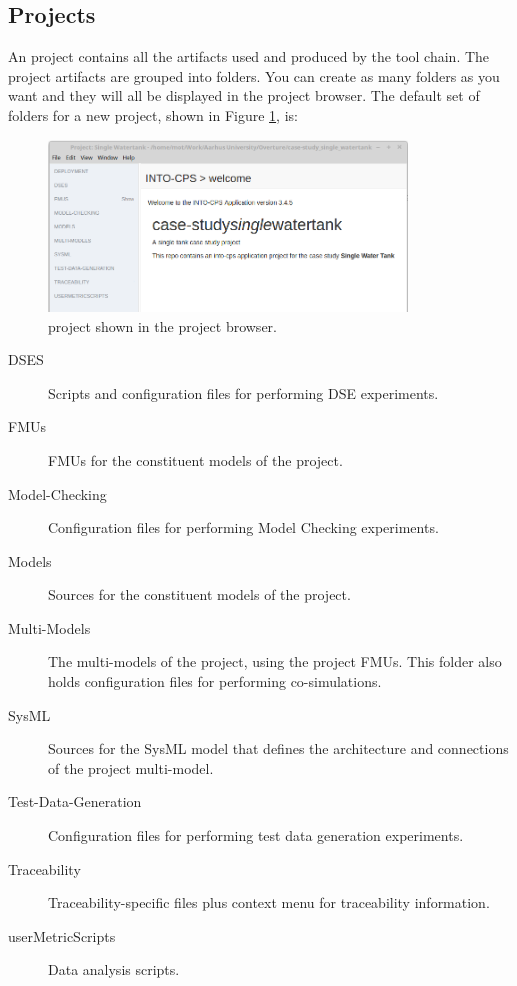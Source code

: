 \subsection{Projects}
\label{sub:projects}
An \into project contains all the artifacts used and produced by the tool
chain. The project artifacts are grouped into folders. You can create as
many folders as you want and they will all be displayed in the project browser.
The default set of folders for a new project, shown in Figure \ref{fig:app-proj}, is:
%
%
%
\begin{figure}[ht]
\centering
\includegraphics[width=0.85\textwidth]{./figures/app/projbrowser}
\caption{\into project shown in the project browser.}
\label{fig:app-proj}
\end{figure}
%
%
%
\begin{description}
  \item[DSES] Scripts and configuration files for
    performing DSE experiments.
  \item[FMUs] FMUs for the constituent models of the project.
  \item[Model-Checking] Configuration files for performing Model Checking experiments.
  \item[Models] Sources for the  constituent models of the project.
  \item[Multi-Models] The multi-models of the project, using the project FMUs. This
    folder also holds configuration files for performing co-simulations.
  \item[SysML] Sources for the SysML model that defines the architecture and
    connections of the project multi-model. 
  \item[Test-Data-Generation] Configuration files for performing test data
    generation experiments.
  \item[Traceability]  Traceability-specific files plus context menu for traceability information.
  \item[userMetricScripts]  Data analysis scripts.
\end{description}

